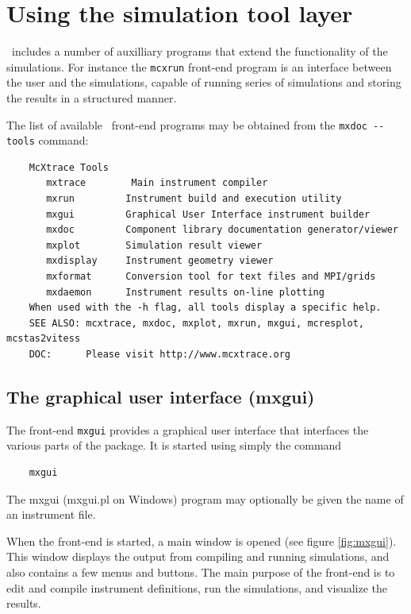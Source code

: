 \section{Using the simulation tool layer}
\label{s:frontends}

\MCX\ includes a number of auxilliary programs that extend the
functionality of the simulations. For instance the \verb+mcxrun+ front-end program is an interface
between the user and the simulations, capable of running series of simulations and storing the results in a structured manner.

The list of available \MCX\ front-end programs may be obtained from the \verb+mxdoc --tools+ command:
\begin{verbatim}
    McXtrace Tools
       mxtrace        Main instrument compiler
       mxrun         Instrument build and execution utility
       mxgui         Graphical User Interface instrument builder
       mxdoc         Component library documentation generator/viewer
       mxplot        Simulation result viewer
       mxdisplay     Instrument geometry viewer
       mxformat      Conversion tool for text files and MPI/grids
       mxdaemon      Instrument results on-line plotting
    When used with the -h flag, all tools display a specific help.
    SEE ALSO: mcxtrace, mxdoc, mxplot, mxrun, mxgui, mcresplot, mcstas2vitess
    DOC:      Please visit http://www.mcxtrace.org
\end{verbatim}

\subsection{The graphical user interface (mxgui)}
\label{s:mxgui}

The front-end \verb+mxgui+ provides a graphical user interface that
interfaces the various parts of the \MCX  package. It is started using
simply the command
\begin{verbatim}
    mxgui
\end{verbatim}
The mxgui (mxgui.pl on Windows) program may optionally be given the name of an instrument file.

When the front-end is started, a main window is opened (see figure \ref{fig:mxgui}). This window
displays the output from compiling and running simulations, and also
contains a few menus and buttons. The main purpose of the front-end is
to edit and compile instrument definitions, run the simulations, and
visualize the results.

